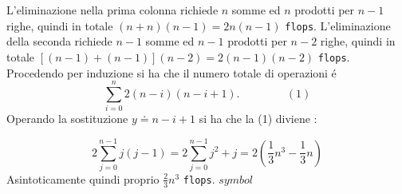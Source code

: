 L'eliminazione nella prima colonna richiede $n$ somme ed $n$ prodotti per $n-1$ righe, quindi in totale $(n+n)(n-1) = 2n(n-1)$ \texttt{flops}. L'eliminazione della seconda richiede $n-1$ somme ed $n-1$ prodotti per $n-2$ righe, quindi in totale $[(n-1)+(n-1)](n-2) = 2(n-1)(n-2)$ \texttt{flops}.\\
Procedendo per induzione si ha che il numero totale di operazioni \'e
\[
\sum_{i=0}^{n} 2(n-i)(n-i+1). \hspace{50pt} (1)
\]
Operando la sostituzione $y \doteq n-i+1$ si ha che la (1) diviene :

\[
2 \sum_{j=0}^{n-1} j(j-1) = 2 \sum_{j=0}^{n-1}j^2 + j = 2 ( \frac{1}{3}n^3 - \frac{1}{3}n)
\]
Asintoticamente quindi proprio $\frac{2}{3}n^3$ \texttt{flops}.
$symbol$
